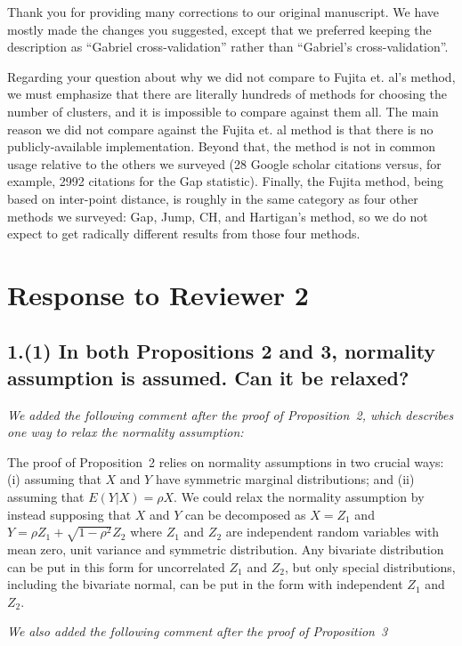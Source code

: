 \documentclass[11pt]{article}
\begin{document}
Thank you for providing many corrections to our original manuscript. We have
mostly made the changes you suggested, except that we preferred keeping the
description as ``Gabriel cross-validation'' rather than ``Gabriel's
cross-validation''.

Regarding your question about why we did not compare to Fujita et. al's
method, we must emphasize that there are literally hundreds of methods for
choosing the number of clusters, and it is impossible to compare against them
all. The main reason we did not compare against the Fujita et. al method is
that there is no publicly-available implementation. Beyond that, the method is
not in common usage relative to the others we surveyed (28 Google scholar
citations versus, for example, 2992 citations for the Gap statistic). Finally,
the Fujita method, being based on inter-point distance, is roughly in the same
category as four other methods we surveyed: Gap, Jump, CH, and Hartigan's
method, so we do not expect to get radically different results from those four
methods.



\section{Response to Reviewer 2}

\subsection{1.(1) In both Propositions 2 and 3, normality assumption is assumed.
Can it be relaxed?}

\emph{We added the following comment after the proof of Proposition~2, which
describes one way to relax the normality assumption:}

The proof of Proposition~2 relies on normality assumptions
in two crucial ways: (i) assuming that $X$ and $Y$ have symmetric marginal
distributions; and (ii) assuming that $E(Y|X) = \rho X$. We could relax the
normality assumption by instead supposing that $X$ and $Y$ can be decomposed
as $X = Z_1$ and $Y = \rho Z_1 + \sqrt{1-\rho^2}Z_2$ where $Z_1$ and $Z_2$ are
independent random variables with mean zero, unit variance and symmetric
distribution. Any bivariate distribution can be put in this form for
uncorrelated $Z_1$ and $Z_2$, but only special distributions, including the
bivariate normal, can be put in the form with independent $Z_1$ and $Z_2$.

\emph{We also added the following comment after the proof of Proposition~3}
\end{document}
